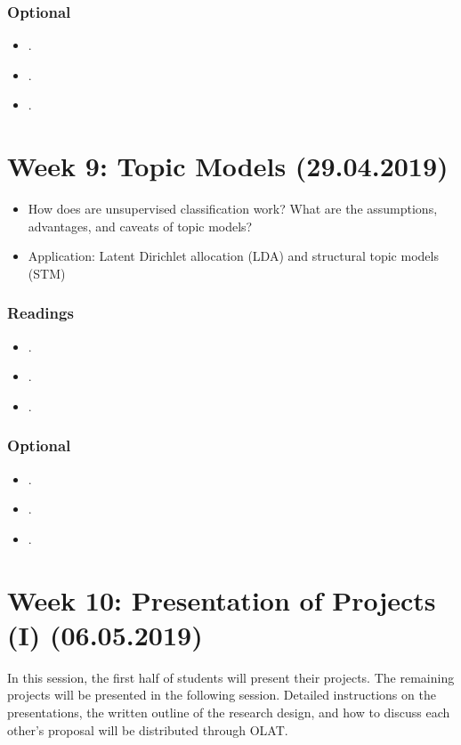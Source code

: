 \documentclass[abstract=on,parskip=full,headings=standardclasses,fontsize=11pt,paper=a4]{scrartcl}
\begin{document}
\subsubsection*{Optional}
\begin{itemize}
\item {}.
\item {}.
\item {}.
\end{itemize}


\section{Week 9: Topic Models (29.04.2019)}

\begin{itemize}
\item How does are unsupervised classification work? What are the assumptions, advantages, and caveats of topic models? 
\item Application: Latent Dirichlet allocation (LDA) and structural topic models (STM)
\end{itemize}

\subsubsection*{Readings}
\begin{itemize}
\item {}.
\item {}.
\item {}.
\end{itemize}


\subsubsection*{Optional}
\begin{itemize}
\item {}.
\item {}.
\item {}.
\end{itemize}

\section{Week 10: Presentation of Projects (I) (06.05.2019)}

In this session, the first half of students will present their projects. The remaining projects will be presented in the following session. Detailed instructions on the presentations, the written outline of the research design, and how to discuss each other's proposal will be distributed through OLAT.
\end{document}
